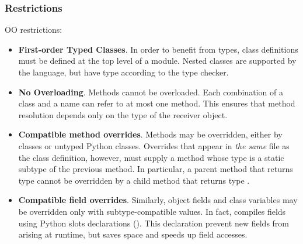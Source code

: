 \documentclass[a4paper,english,cleveref,autoref,thm-restate,anonymous,]{lipics-v2021}
\begin{document}
\subsubsection{Restrictions}

OO restrictions:

\begin{itemize}
  \item \textbf{First-order Typed Classes}.
    In order to benefit from types, class definitions must be defined at the top level of a module.
    Nested classes are supported by the language, but have type  according
    to the type checker.

  \item \textbf{No Overloading}.
    Methods cannot be overloaded. Each combination of a class
    and a name can refer to at most one method.
    This ensures that method resolution depends only on the
    type of the receiver object.


  \item \textbf{Compatible method overrides}.
    Methods may be overridden, either by \SP{} classes or
    untyped Python classes.
    Overrides that appear in \emph{the same} \SP{} file as the class definition, however,
    must supply a method whose type is a static subtype of the previous method.
    In particular, a parent method that returns type  cannot be
    overridden by a child method that returns type .


  \item \textbf{Compatible field overrides}.
    Similarly, object fields and class variables may be overridden
    only with subtype-compatible values.
    In fact, \SP{} compiles fields using Python slots
    declarations ().
    This declaration prevent new fields from arising at runtime,
    but saves space and speeds up field accesses.


\end{itemize}
\end{document}
